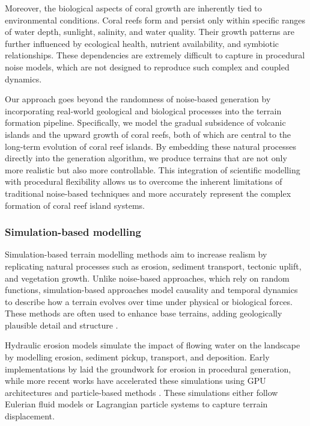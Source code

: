 Moreover, the biological aspects of coral growth are inherently tied to environmental conditions. Coral reefs form and persist only within specific ranges of water depth, sunlight, salinity, and water quality. Their growth patterns are further influenced by ecological health, nutrient availability, and symbiotic relationships. These dependencies are extremely difficult to capture in procedural noise models, which are not designed to reproduce such complex and coupled dynamics.

Our approach goes beyond the randomness of noise-based generation by incorporating real-world geological and biological processes into the terrain formation pipeline. Specifically, we model the gradual subsidence of volcanic islands and the upward growth of coral reefs, both of which are central to the long-term evolution of coral reef islands. By embedding these natural processes directly into the generation algorithm, we produce terrains that are not only more realistic but also more controllable. This integration of scientific modelling with procedural flexibility allows us to overcome the inherent limitations of traditional noise-based techniques and more accurately represent the complex formation of coral reef island systems.

\subsubsection{Simulation-based modelling}

Simulation-based terrain modelling methods aim to increase realism by replicating natural processes such as erosion, sediment transport, tectonic uplift, and vegetation growth. Unlike noise-based approaches, which rely on random functions, simulation-based approaches model causality and temporal dynamics to describe how a terrain evolves over time under physical or biological forces. These methods are often used to enhance base terrains, adding geologically plausible detail and structure \cite{Benes2006, Smelik2009}.


Hydraulic erosion models simulate the impact of flowing water on the landscape by modelling erosion, sediment pickup, transport, and deposition. Early implementations by \cite{Musgrave1989} laid the groundwork for erosion in procedural generation, while more recent works have accelerated these simulations using GPU architectures \cite{Mei2007} and particle-based methods \cite{Neidhold2005}. These simulations either follow Eulerian fluid models or Lagrangian particle systems to capture terrain displacement.

